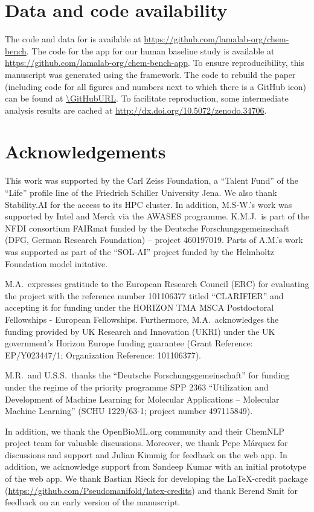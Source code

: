 \documentclass[11pt, oneside]{article}
\begin{document}
\begin{refsection}
\section*{Data and code availability}
The code and data for \chembench is available at \url{https://github.com/lamalab-org/chem-bench}.
The code for the app for our human baseline study is available at \url{https://github.com/lamalab-org/chem-bench-app}.
To ensure reproducibility, this manuscript was generated using the \href{https://show-your.work/en/latest/}{\showyourwork} framework.\autocite{Luger2021}
The code to rebuild the paper (including code for all figures and numbers next to which there is a GitHub icon) can be found at \url{\GitHubURL}.
To facilitate reproduction, some intermediate analysis results are cached at \url{http://dx.doi.org/10.5072/zenodo.34706}.

\section*{Acknowledgements}
This work was supported by the Carl Zeiss Foundation, a \enquote{Talent Fund} of the \enquote{Life} profile line of the Friedrich Schiller University Jena.
We also thank Stability.AI for the access to its HPC cluster. In addition, M.S-W.'s work was supported by Intel and Merck via the AWASES programme.
K.M.J.\ is part of the NFDI consortium FAIRmat funded by the Deutsche Forschungsgemeinschaft (DFG, German Research Foundation) – project 460197019.
Parts of A.M.'s work was supported as part of the \enquote{SOL-AI} project funded by the Helmholtz Foundation model initative.

M.A.\ expresses gratitude to the European Research Council (ERC) for evaluating the project with the reference number 101106377 titled \enquote{CLARIFIER} and accepting it for funding under the HORIZON TMA MSCA Postdoctoral Fellowships - European Fellowships.
Furthermore, M.A.\ acknowledges the funding provided by UK Research and Innovation (UKRI) under the UK government’s Horizon Europe funding guarantee (Grant Reference: EP/Y023447/1; Organization Reference: 101106377).

M.R.\ and U.S.S.\ thanks the \enquote{Deutsche Forschungsgemeinschaft} for funding under the regime of the priority programme SPP 2363 \enquote{Utilization and Development of Machine Learning for Molecular Applications – Molecular Machine Learning} (SCHU 1229/63-1; project number 497115849).

In addition, we thank the OpenBioML.org community and their ChemNLP project team for valuable discussions.
Moreover, we thank Pepe Márquez for discussions and support and Julian Kimmig for feedback on the web app.
In addition, we acknowledge support from Sandeep Kumar with an initial prototype of the web app.
We thank Bastian Rieck for developing the \LaTeX-credit package (\url{https://github.com/Pseudomanifold/latex-credits}) and thank Berend Smit for feedback on an early version of the manuscript.



\end{refsection}
\end{document}
